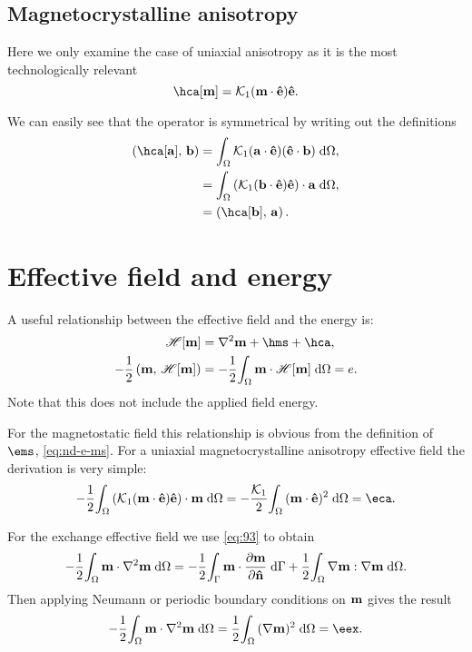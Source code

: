 \subsection{Magnetocrystalline anisotropy}

Here we only examine the case of uniaxial anisotropy as it is the most technologically relevant
\begin{equation}
  \hca[\mv] = \kone (\mv \cdot \ev) \ev.
\end{equation}

We can easily see that the operator is symmetrical by writing out the definitions
\begin{equation}
  \begin{aligned}
    \ip{\hca[\av]}{\bv} &= \intd{ \kone (\av \cdot \ev) (\ev \cdot \bv)}, \\
    &= \intd{(\kone(\bv \cdot \ev) \ev) \cdot \av}, \\
    &= \ip{\hca[\bv]}{\av}.
  \end{aligned}
\end{equation}


\section{Effective field and energy}
\label{sec:energy-field-relation}

A useful relationship between the effective field and the energy is:
\begin{equation}
  \begin{aligned}
    \hop[\mv] &=  \lap \mv + \hms + \hca, \\
    -\frac{1}{2} \ip{\mv}{\hop[\mv]} &= - \frac{1}{2} \intd{\mv \cdot
      \hop[\mv]} = \e.
  \end{aligned}
\end{equation}
Note that this does not include the applied field energy.

For the magnetostatic field this relationship is obvious from the definition of $\ems$, \cref{eq:nd-e-ms}.
For a uniaxial magnetocrystalline anisotropy effective field the derivation is very simple:
\begin{equation}
  - \frac{1}{2} \intd{\bigb{\kone (\mv \cdot \ev) \ev} \cdot \mv} =  - \frac{\kone}{2}\intd{(\mv \cdot \ev)^2} = \eca.
\end{equation}

For the exchange effective field we use \cref{eq:93} to obtain
\begin{equation}
  -\frac{1}{2} {\int_{\Omega} {\boldsymbol{\mathrm{m}} \cdot \nabla^2  \boldsymbol{\mathrm{m}}} {\; \mathrm{{d}}} {\Omega}} = -\frac{1}{2} {\int_{{\Gamma}} {\boldsymbol{\mathrm{m}} \cdot \frac{\partial \boldsymbol{\mathrm{m}}}{\partial \boldsymbol{\mathrm{\hat{n}}}}} {\; \mathrm{{d}}} {{\Gamma}}} + \frac{1}{2}  {\int_{\Omega} {\nabla \boldsymbol{\mathrm{m}} : \nabla \boldsymbol{\mathrm{m}}} {\; \mathrm{{d}}} {\Omega}}.
\end{equation}
Then applying Neumann or periodic boundary conditions on $\boldsymbol{\mathrm{m}}$ gives the result
\begin{equation}
  -\frac{1}{2} \intd{\mv \cdot \lap \mv} = \frac{1}{2} \intd{(\grad \mv)^2} = \eex.
\end{equation}



